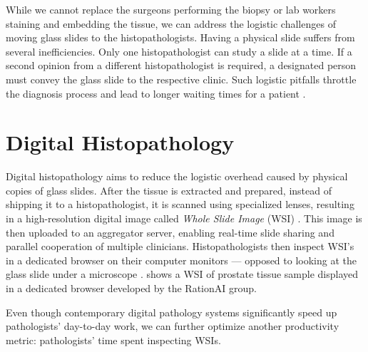 While we cannot replace the surgeons performing the biopsy or lab workers staining and embedding the tissue, we can address the logistic challenges of moving glass slides to the histopathologists.
Having a physical slide suffers from several inefficiencies. 
Only one histopathologist can study a slide at a time. If a second opinion from a different histopathologist is required, a designated person must convey the glass slide to the respective clinic.
Such logistic pitfalls throttle the diagnosis process and lead to longer waiting times for a patient \cite{from-traditional-to-digital-histopathology}.

\section{Digital Histopathology}

Digital histopathology aims to reduce the logistic overhead caused by physical copies of glass slides.
After the tissue is extracted and prepared, instead of shipping it to a histopathologist, it is scanned using specialized lenses, resulting in a high-resolution digital image called \emph{Whole Slide Image} (WSI) \cite{from-traditional-to-digital-histopathology}.
This image is then uploaded to an aggregator server, enabling real-time slide sharing and parallel cooperation of multiple clinicians.
Histopathologists then inspect WSI's in a dedicated browser on their computer monitors --- opposed to looking at the glass slide under a microscope \cite{digital-histopathology-process}.  shows a WSI of prostate tissue sample displayed in a dedicated browser developed by the RationAI group.

Even though contemporary digital pathology systems significantly speed up pathologists' day-to-day work, we can further optimize another productivity metric: pathologists' time spent inspecting WSIs.

